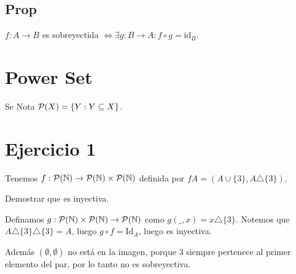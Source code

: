 \documentclass{article}
\begin{document}
	\subsection{Prop}
	$f : A \to B$ es sobreyectida $\iff \exists g : B \to A : f \circ g = \text{id}_B$.

	\section{Power Set}
	Se Nota $\mathcal{P}(X) = \{Y : Y \subseteq X\}$.

	\section{Ejercicio 1}
	Tenemos $f : \mathcal{P} (\mathbb{N}) \to \mathcal{P} (\mathbb{N}) \times \mathcal{P} (\mathbb{N})$ definida por $f A =
	(A \cup \{3\}, A \triangle \{3\})$.

	Demostrar que es inyectiva.

	Definamos $g : \mathcal{P}(\mathbb{N}) \times \mathcal{P}(\mathbb{N}) \to \mathcal{P}(\mathbb{N})$ como $g (\_, x) = x \triangle \{3\}$.
	Notemos que $A \triangle \{3\}\triangle \{3\} = A$, luego $g \circ f = \text{Id}_A$,
	luego es inyectiva.

	Además $(\emptyset, \emptyset)$ no está en la imagen, porque $3$ siempre pertenece
	al primer elemento del par, por lo tanto no es sobreyectiva.
\end{document}
